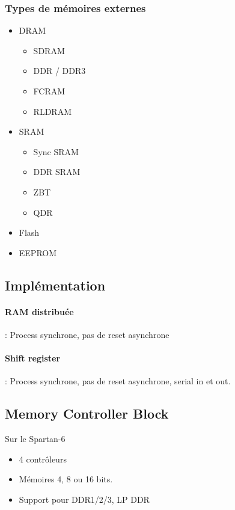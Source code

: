 \documentclass[resume]{subfiles}
\begin{document}
\subsubsection{Types de mémoires externes}
\begin{itemize}
\item DRAM
\begin{itemize}
\item SDRAM
\item DDR / DDR3
\item FCRAM
\item RLDRAM
\end{itemize}
\item SRAM
\begin{itemize}
\item Sync SRAM
\item DDR SRAM
\item ZBT
\item QDR
\end{itemize}
\item Flash
\item EEPROM
\end{itemize}
\subsection{Implémentation}
\paragraph{RAM distribuée} : Process synchrone, pas de reset asynchrone
\paragraph{Shift register} : Process synchrone, pas de reset asynchrone, serial in et out.


\subsection{Memory Controller Block}
Sur le Spartan-6
\begin{itemize}
\item 4 contrôleurs
\item Mémoires 4, 8 ou 16 bits.
\item Support pour DDR1/2/3, LP DDR
\end{itemize}
\end{document}
